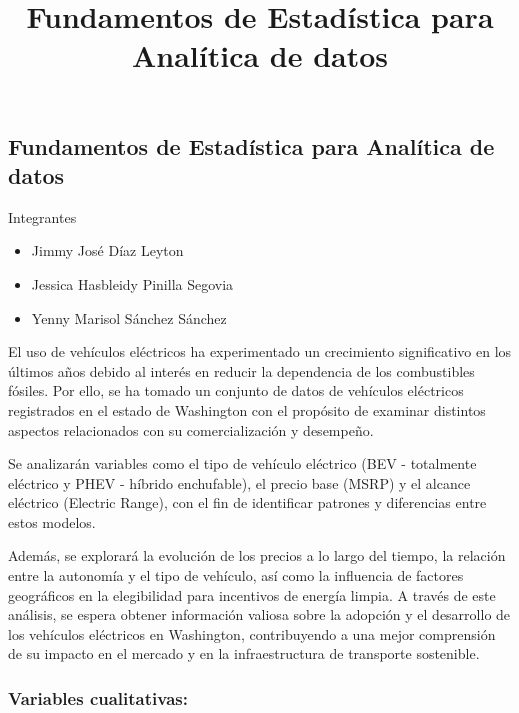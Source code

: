\documentclass[
]{article}
\title{Fundamentos de Estadística para Analítica de datos}
\author{}
\date{\vspace{-2.5em}}
\providecommand{\tightlist}{%
  \setlength{\itemsep}{0pt}\setlength{\parskip}{0pt}}
\begin{document}
\maketitle

\subsection{Fundamentos de Estadística para Analítica de
datos}\label{fundamentos-de-estaduxedstica-para-analuxedtica-de-datos}

Integrantes

\begin{itemize}
\tightlist
\item
  Jimmy José Díaz Leyton
\item
  Jessica Hasbleidy Pinilla Segovia
\item
  Yenny Marisol Sánchez Sánchez
\end{itemize}

El uso de vehículos eléctricos ha experimentado un crecimiento
significativo en los últimos años debido al interés en reducir la
dependencia de los combustibles fósiles. Por ello, se ha tomado un
conjunto de datos de vehículos eléctricos registrados en el estado de
Washington con el propósito de examinar distintos aspectos relacionados
con su comercialización y desempeño.

Se analizarán variables como el tipo de vehículo eléctrico (BEV -
totalmente eléctrico y PHEV - híbrido enchufable), el precio base (MSRP)
y el alcance eléctrico (Electric Range), con el fin de identificar
patrones y diferencias entre estos modelos.

Además, se explorará la evolución de los precios a lo largo del tiempo,
la relación entre la autonomía y el tipo de vehículo, así como la
influencia de factores geográficos en la elegibilidad para incentivos de
energía limpia. A través de este análisis, se espera obtener información
valiosa sobre la adopción y el desarrollo de los vehículos eléctricos en
Washington, contribuyendo a una mejor comprensión de su impacto en el
mercado y en la infraestructura de transporte sostenible.

\subsubsection{\texorpdfstring{\textbf{Variables
cualitativas:}}{Variables cualitativas:}}\label{variables-cualitativas}
\end{document}

